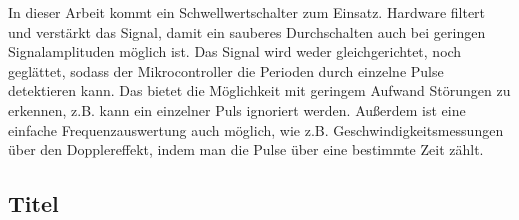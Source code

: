 In dieser Arbeit kommt ein Schwellwertschalter zum Einsatz. Hardware filtert und verstärkt das Signal, damit ein sauberes Durchschalten auch bei geringen Signalamplituden möglich ist. Das Signal wird weder gleichgerichtet, noch geglättet, sodass der Mikrocontroller die Perioden durch einzelne Pulse detektieren kann. Das bietet die Möglichkeit mit geringem Aufwand Störungen zu erkennen, z.B. kann ein einzelner Puls ignoriert werden. Außerdem ist eine einfache Frequenzauswertung auch möglich, wie z.B. Geschwindigkeitsmessungen über den Dopplereffekt, indem man die Pulse über eine bestimmte Zeit zählt.\\


\subsection{Titel}



